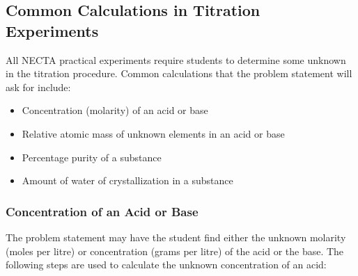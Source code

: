 %


\subsection{Common Calculations in Titration Experiments}
\label{sub:titcalc}

All NECTA practical experiments require students to determine some unknown in the titration procedure. Common calculations that the problem statement will ask for include:

\begin{itemize}

\item{Concentration (molarity) of an acid or base}
\item{Relative atomic mass of unknown elements in an acid or base}
\item{Percentage purity of a substance}
\item{Amount of water of crystallization in a substance}

\end{itemize}

\subsubsection{Concentration of an Acid or Base}

The problem statement may have the student find either the unknown molarity (moles per litre) or concentration (grams per litre) of the acid or the base. The following steps are used to calculate the unknown concentration of an acid:

